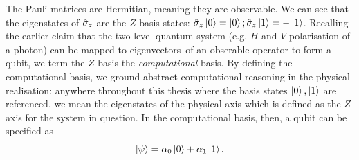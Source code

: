 {\par
The Pauli matrices are Hermitian, meaning they are observable. 
We can see that the eigenstates of $\hat{\sigma}_{z}$ are the $Z$-basis states:
    $\hat{\sigma}_{z} \ket{0} = \ket{0}; \hat{\sigma}_{z} \ket{1} = - \ket{1}$.
Recalling the earlier claim that the two-level quantum system (e.g. $H$ and $V$ polarisation of a photon)
    can be mapped to eigenvectors\footnotemark \ of an obserable operator to form a qubit, 
    we term the $Z$-basis the \emph{computational} basis.
By defining the computational basis, we ground abstract computational reasoning in the physical realisation:
    anywhere throughout this thesis where the basis states $\ket{0}, \ket{1}$ are referenced, 
    we mean the eigenstates of the physical axis which is defined as the $Z$-axis for the system in question. 
In the computational basis, then, a qubit can be specified as
\begin{equation}
    \label{eqn:computational_qubit}
    \ket{\psi} = \alpha_0 \ket{0} + \alpha_1 \ket{1}.
\end{equation}

}
